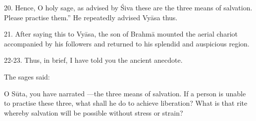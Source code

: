 20. Hence, O holy sage, as advised by Śiva these are the three means of
salvation. Please practise them.” He repeatedly advised Vyāsa thus.

21. After saying this to Vyāsa, the son of Brahmā mounted the aerial chariot
accompanied by his followers and returned to his splendid and auspicious region.

22-23. Thus, in brief, I have told you the ancient anecdote.

The sages said:

O Sūta, you have narrated  \etc—the three means of salvation. If
a person is unable to practise these three, what shall he do to achieve
liberation? What is that rite whereby salvation will be possible without stress
or strain?
